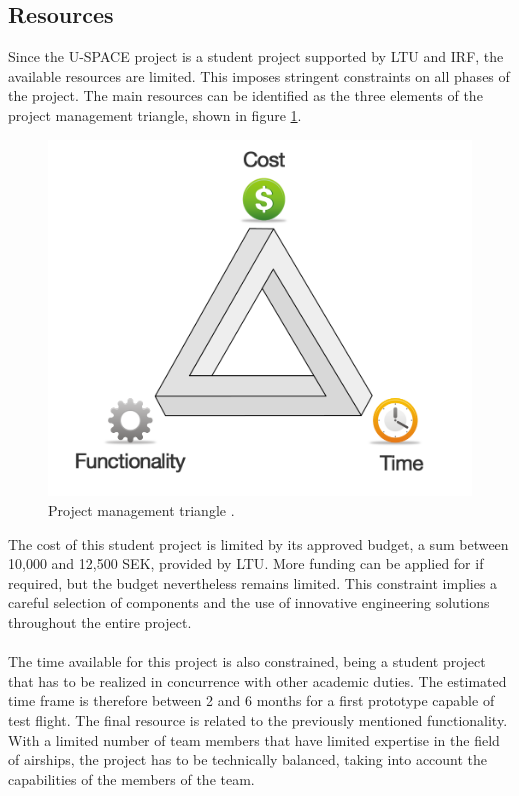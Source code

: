\subsection{Resources}
%
Since the \ac{U-SPACE} project is a student project supported by \ac{LTU} and \ac{IRF}, the available resources are limited. This imposes stringent constraints on all phases of the project. The main resources can be identified as the three elements of the project management triangle, shown in figure \ref{fig:project_triangle}.
%
\begin{figure}[htbp!]
\centering
\includegraphics[scale=0.2]{figures/project_triangle.png}
\caption[Project management triangle]{Project management triangle \cite{website:claromentis}.}
\label{fig:project_triangle}
\end{figure}
%
\noindent
The cost of this student project is limited by its approved budget, a sum between 10,000 and 12,500 SEK, provided by \ac{LTU}. More funding can be applied for if required, but the budget nevertheless remains limited. This constraint implies a careful selection of components and the use of innovative engineering solutions throughout the entire project. 
\\
\\
The time available for this project is also constrained, being a student project that has to be realized in concurrence with other academic duties. The estimated time frame is therefore between 2 and 6 months for a first prototype capable of test flight.
%
\pagebreak
%
\noindent
The final resource is related to the previously mentioned functionality. With a limited number of team members that have limited expertise in the field of airships, the project has to be technically balanced, taking into account the capabilities of the members of the team.
%
